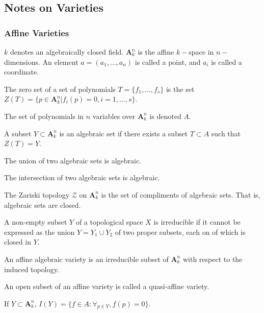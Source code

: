 \documentclass[crop=false,class=book]{standalone}
\begin{document}
\subsection{Notes on Varieties}
\subsubsection{Affine Varieties}
$k$ denotes an algebraically closed field. $\textbf{A}_{k}^n$ is the affine $k-$space in $n-$dimensions. An element $a=(a_1,\hdots, a_n)$ is called a point, and $a_i$ is called a coordinate.
\begin{definition}
The zero set of a set of polynomials $T = \{f_1,\hdots, f_s\}$ is the set $Z(T) = \{p\in \textbf{A}_k^n|f_i(p) = 0,i=1,\hdots, s\}$.
\end{definition}
\begin{notation}
The set of polynomials in $n$ variables over $\textbf{A}_k^n$ is denoted $A$.
\end{notation}
\begin{definition}
A subset $Y\subset \textbf{A}_k^n$ is an algebraic set if there exists a subset $T\subset A$ such that $Z(T) = Y$.
\end{definition}
\begin{theorem}
The union of two algebraic sets is algebraic.
\end{theorem}
\begin{theorem}
The intersection of two algebraic sets is algebraic.
\end{theorem}
\begin{definition}
The Zariski topology $\mathcal{Z}$ on $\textbf{A}_{k}^n$ is the set of compliments of algebraic sets. That is, algebraic sets are closed.
\end{definition}
\begin{definition}
A non-empty subset $Y$ of a topological space $X$ is irreducible if it cannot be expressed as the union $Y=Y_1\cup Y_2$ of two proper subsets, each on of which is closed in $Y$.
\end{definition}
\begin{definition}
An affine algebraic variety is an irreducible subset of $\textbf{A}_k^n$ with respect to the induced topology.
\end{definition}
\begin{definition}
An open subset of an affine variety is called a quasi-affine variety.
\end{definition}
\begin{notation}
If $Y\subset \textbf{A}_k^n$, $I(Y) = \{f\in A:\forall_{p\in Y}, f(p) = 0\}$.
\end{notation}
\end{document}
